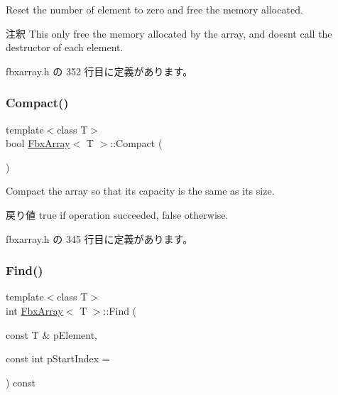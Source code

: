 Reset the number of element to zero and free the memory allocated. \begin{DoxyRemark}{注釈}
This only free the memory allocated by the array, and doesn\textquotesingle{}t call the destructor of each element. 
\end{DoxyRemark}


 fbxarray.\+h の 352 行目に定義があります。

\mbox{\label{class_fbx_array_af841a63f9f07b47630ccae34aee7b97a}} 
\subsubsection{\texorpdfstring{Compact()}{Compact()}}
{\footnotesize\ttfamily template$<$class T$>$ \\
bool \hyperlink{class_fbx_array}{Fbx\+Array}$<$ T $>$\+::Compact (\begin{DoxyParamCaption}{ }\end{DoxyParamCaption})\hspace{0.3cm}{\ttfamily [inline]}}

Compact the array so that its capacity is the same as its size. \begin{DoxyReturn}{戻り値}
{\ttfamily true} if operation succeeded, {\ttfamily false} otherwise. 
\end{DoxyReturn}


 fbxarray.\+h の 345 行目に定義があります。

\mbox{\label{class_fbx_array_a3f49660f02887b59d7e66ed09aa0d1cb}} 
\subsubsection{\texorpdfstring{Find()}{Find()}}
{\footnotesize\ttfamily template$<$class T$>$ \\
int \hyperlink{class_fbx_array}{Fbx\+Array}$<$ T $>$\+::Find (\begin{DoxyParamCaption}\item[{const T \&}]{p\+Element,  }\item[{const int}]{p\+Start\+Index = {} }\end{DoxyParamCaption}) const\hspace{0.3cm}{\ttfamily [inline]}}

